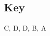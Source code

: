 \documentclass{exam}
\begin{document}
\begin{questions}
\end{questions}

\vfill
\subsection*{Key}
C, D, D, B, A
\end{document}
